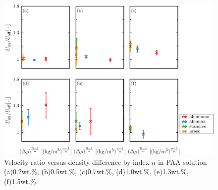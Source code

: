 \begin{figure}[ht]
    \centering
    \includegraphics[width=1.0\textwidth]{./5-Results/rhoUdiff_index_n.eps}
    \caption{Velocity ratio versus density difference by index $n$ in PAA solution (a)0.2wt.\%, (b)0.5wt.\%, (c)0.7wt.\%, (d)1.0wt.\%, (e)1.3wt.\%, (f)1.5wt.\%.}
    \label{fig:rhoUdiff_n}
\end{figure}
